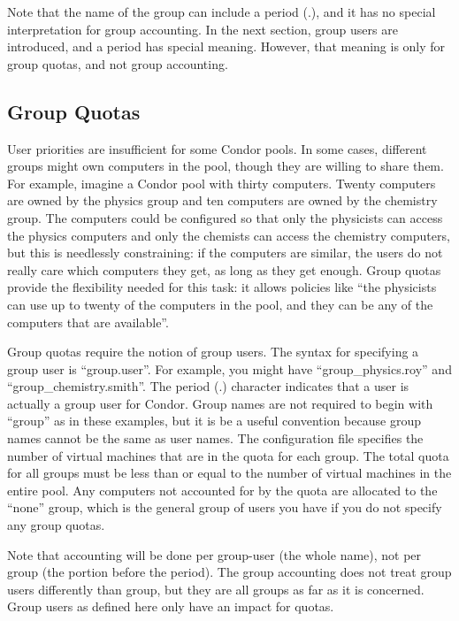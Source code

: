 Note that the name of the group can include a period (.), and it has
no special interpretation for group accounting. In the next section,
group users are introduced, and a period has special meaning. However,
that meaning is only for group quotas, and not group accounting. 

\subsection{Group Quotas}
\label{sec:group-quotas}

User priorities are insufficient for some Condor pools. In some cases,
different groups might own computers in the pool, though they are
willing to share them. For example, imagine a Condor pool with thirty
computers. Twenty computers are owned by the physics group and ten
computers are owned by the chemistry group. The computers could be
configured so that only the physicists can access the physics
computers and only the chemists can access the chemistry computers,
but this is needlessly constraining: if the computers are similar, the
users do not really care which computers they get, as long as they get
enough. Group quotas provide the flexibility needed for this task: it
allows policies like ``the physicists can use up to twenty of the
computers in the pool, and they can be any of the computers that are
available''.

Group quotas require the notion of group users. The syntax for
specifying a group user is ``group.user''. For example, you might have
``group\_physics.roy'' and ``group\_chemistry.smith''. The period (.)
character indicates that a user is actually a group user for
Condor. Group names are not required to begin with ``group'' as in
these examples, but it is be a useful convention because group names
cannot be the same as user names. The configuration file specifies the
number of virtual machines that are in the quota for each group. The
total quota for all groups must be less than or equal to the number of
virtual machines in the entire pool. Any computers not accounted for
by the quota are allocated to the ``none'' group, which is the general
group of users you have if you do not specify any group quotas.

Note that accounting will be done per group-user (the whole name), not
per group (the portion before the period). The group accounting does
not treat group users differently than group, but they are all groups
as far as it is concerned. Group users as defined here only have an
impact for quotas.

